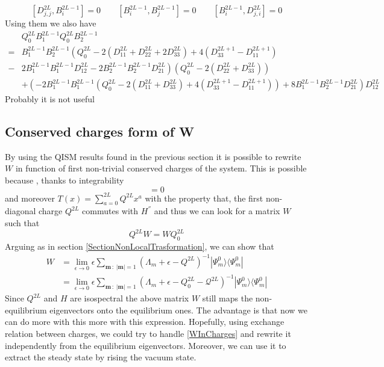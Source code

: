 \documentclass[10pt]{article}
\numberwithin{equation}{section}
\numberwithin{equation}{subsection}
\begin{document}
\begin{equation}\label{Commuting-Charges}
\left[D_{j,j}^{2L},B_{i}^{2L-1}\right]=0\qquad \left[B_{i}^{2L-1},B_{j}^{2L-1}\right]=0\qquad \left[B_{i}^{2L-1},D_{j,i}^{2L}\right]=0%
\end{equation}
{\color{blue}Using them we also have 
\begin{equation}
\begin{split}
	&Q_{0}^{2L}B_{1}^{2L-1}Q_{0}^{2L}B_{2}^{2L-1}\\=&B_{1}^{2L-1}B_{2}^{2L-1}\left(Q_{0}^{2L}-2(D_{11}^{2L}+D_{22}^{2L}+2D_{33}^{2L})+4(D_{33}^{2L+1}-D_{11}^{2L+1})\right.\\-&\left.2B_{1}^{2L-1}B_{1}^{2L-1}D_{12}^{2L}-2B_{2}^{2L-1}B_{2}^{2L-1}D_{21}^{2L}\right)\left(Q_{0}^{2L}-2(D_{22}^{2L}+D_{33}^{2L})\right)
	\\&+
	\left(-2B_{1}^{2L-1}B_{1}^{2L-1}\left(Q_{0}^{2L}-2(D_{11}^{2L}+D_{33}^{2L})+4(D_{33}^{2L+1}-D_{11}^{2L+1})\right)+8B_{1}^{2L-1}B_{2}^{2L-1}D_{21}^{2L}\right)D_{12}^{2L}
\end{split}
\end{equation}}{\color{blue}Probably it is not useful}
\subsection{Conserved charges form of W}
By using the QISM results found in the previous section it is possible to rewrite $W$ in function of first non-trivial conserved charges of the system. This is possible because , thanks to integrability
\begin{equation}
	[H,T(x)]=0
\end{equation}
and moreover $T(x)=\sum_{a=0}^{2L}Q^{2L}x^{a}$ with the property that, the first non-diagonal charge $Q^{2L}$ commutes with $H^{''}$ and thus we can look for a matrix $W$ such that 
\begin{equation}
	Q^{2L}W=WQ_{0}^{2L}
\end{equation}
Arguing as in section \ref{SectionNonLocalTrasformation}, we can show that 
\begin{equation}\label{WInCharges}
	\begin{split}
	W&=\lim_{\epsilon\to 0}\epsilon\sum_{\bm{m}\,:\;|\bm{m}|=1}\left(\Lambda_{m}+\epsilon-Q^{2L}\right)^{-1}|\Psi_{m}^{0}\rangle\langle \Psi_{m}^{0}|\\&=\lim_{\epsilon\to 0}\epsilon\sum_{\bm{m}\,:\;|\bm{m}|=1}\left(\Lambda_{m}+\epsilon-Q^{2L}_{0}-\mathcal{Q}^{2L}\right)^{-1}|\Psi_{m}^{0}\rangle\langle \Psi_{m}^{0}|
\end{split}
\end{equation}
Since $Q^{2L}$ and $H$ are isospectral the above matrix $W$ still maps the non-equilibrium eigenvectors onto the equilibrium ones. The advantage is that now we can do more with this more with this expression. Hopefully, using exchange relation between charges, we could try to handle \eqref{WInCharges} and rewrite it independently from the equilibrium eigenvectors. Moreover, we can use it to extract the steady state by rising the vacuum state. 
\end{document}
